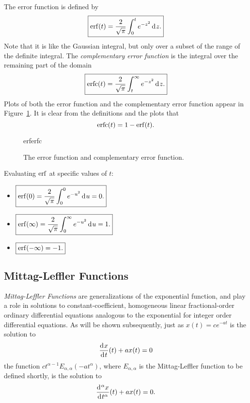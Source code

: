     The error function is defined by
    \begin{equation}
      \boxed{ \operatorname{erf}(t) = \frac{2}{\sqrt{\pi}} \int_0^t e^{-z^2} \operatorname{d}\hspace*{-1pt} z. }
      \label{eq:erf}
    \end{equation}
    Note that it is like the Gaussian integral, but only over a subset of the range of the definite integral. The \emph{complementary error function} is the integral over the remaining part of the domain
    \begin{equation}
      \boxed{ \operatorname{erfc}(t)  = \frac{2}{\sqrt{\pi}} \int_t^\infty e^{-z^2} \operatorname{d}\hspace*{-1pt} z. }
      \label{eq:erfc}
    \end{equation}
    Plots of both the error function and the complementary error function appear in Figure~\ref{fig:erferfc}. It is clear from the definitions and the plots that
    \begin{equation}
      \operatorname{erfc}(t) = 1 - \operatorname{erf}(t).
      \label{eq:erfs}
    \end{equation}

    \begin{figure}
      \centering
      {erferfc}
      \caption{The error function and complementary error function.}
      \label{fig:erferfc}
    \end{figure}

    Evaluating $\operatorname{erf}$ at specific values of $t$:
    \begin{itemize}
      \item $ \boxed{ \operatorname{erf}(0) = \frac{2}{\sqrt{ \pi} } \int_0^0 e^{-u^2} \operatorname{d}\hspace*{-1pt} u = 0. }$
      \item $ \boxed{ \operatorname{erf}(\infty) = \frac{2}{\sqrt{ \pi }} \int_0^\infty e^{-u^2} \operatorname{d}\hspace*{-1pt} u = 1. }$
      \item $ \boxed{ \operatorname{erf}(-\infty) = -1. }$
    \end{itemize}

    \subsection{Mittag-Leffler Functions}
    \emph{Mittag-Leffler Functions} are generalizations of the exponential function, and play a role in solutions to constant-coefficient, homogeneous linear fractional-order ordinary differential equations analogous to the exponential for integer order differential equations. As will be shown subsequently, just as $x(t) = c e^{-a t}$ is the solution to
    \begin{equation*}
      \frac{\operatorname{d}\hspace*{-1pt} x}{\operatorname{d}\hspace*{-1pt} t}(t) + a x(t) = 0
    \end{equation*}
    the function $c t^{\alpha - 1} E_{\alpha,\alpha}\left(-a t^\alpha\right)$, where $E_{\alpha,\alpha}$ is the Mittag-Leffler function to be defined shortly, is the solution to 
    \begin{equation*}
      \frac{\operatorname{d}\hspace*{-1pt}^\alpha x}{\operatorname{d}\hspace*{-1pt} t^\alpha}(t) + a x(t) = 0.
    \end{equation*}

